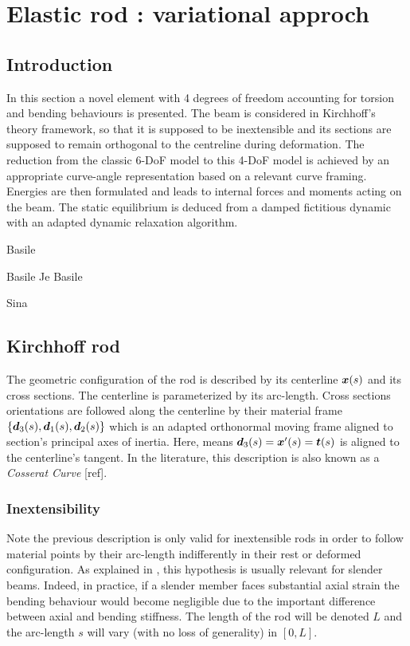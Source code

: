 \chapter{Elastic rod : variational approch}

\section{Introduction}

In this section a novel element with 4 degrees of freedom accounting for torsion and bending behaviours is presented. The beam is considered in Kirchhoff’s theory framework, so that it is supposed to be inextensible and its sections are supposed to remain orthogonal to the centreline during deformation. The reduction from the classic 6-DoF model to this 4-DoF model is achieved by an appropriate curve-angle representation based on a relevant curve framing. Energies are then formulated and leads to internal forces and moments acting on the beam. The static equilibrium is deduced from a damped fictitious dynamic with an adapted dynamic relaxation algorithm.

Basile \cite{Bergou2010}

Basile \cite{Bergou2008}
Je
Basile \cite{Audoly2000}

Sina \cite{Nabei2014}


\section{Kirchhoff rod}
The geometric configuration of the rod is described by its centerline $\boldsymbol{x}(s)$ and its cross sections. The centerline is parameterized by its arc-length. Cross sections orientations are followed along the centerline by their material frame $\{\boldsymbol{d}_3 (s),\boldsymbol{d}_1 (s),\boldsymbol{d}_2 (s)\}$ which is an adapted orthonormal moving frame aligned to section’s principal axes of inertia. Here,  means $\boldsymbol{d}_3 (s)=\boldsymbol{x}'(s)=\boldsymbol{t}(s)$ is aligned to the centerline’s tangent. In the literature, this description is also known as a \emph{Cosserat Curve} [ref].

\subsection{Inextensibility}
Note the previous description is only valid for inextensible rods in order to follow material points by their arc-length indifferently in their rest or deformed configuration. As explained in \cite{Audoly2010}, this hypothesis is usually relevant for slender beams. Indeed, in practice, if a slender member faces substantial axial strain the bending behaviour would become negligible due to the important difference between axial and bending stiffness. The length of the rod will be denoted $L$ and the arc-length $s$ will vary (with no loss of generality) in $[0,L]$.

